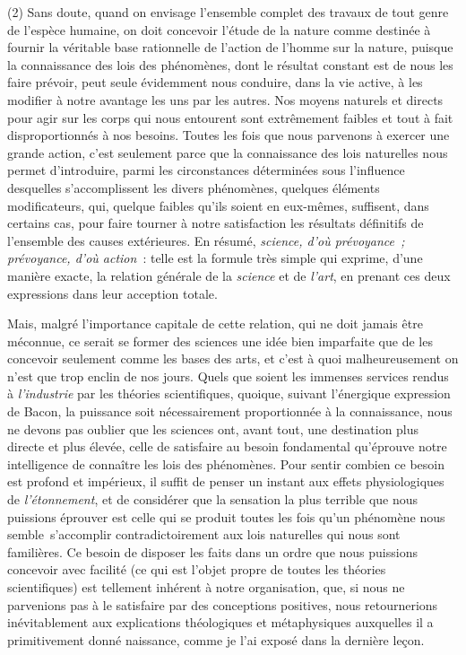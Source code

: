 \documentclass[french,twoside]{book} %
\begin{document}
(2) Sans doute, quand on envisage l’ensemble complet des travaux de tout genre de l’espèce humaine, on doit concevoir l’étude de la nature comme destinée à fournir la véritable base rationnelle de l’action de l’homme sur la nature, puisque la connaissance des lois des phénomènes, dont le résultat constant est de nous les faire prévoir, peut seule évidemment nous conduire, dans la vie active, à les modifier à notre avantage les uns par les autres. Nos moyens naturels et directs pour agir sur les corps qui nous entourent sont extrêmement faibles et tout à fait disproportionnés à nos besoins. Toutes les fois que nous parvenons à exercer une grande action, c’est seulement parce que la connaissance des lois naturelles nous permet d’introduire, parmi les circonstances déterminées sous l’influence desquelles s’accomplissent les divers phénomènes, quelques éléments modificateurs, qui, quelque faibles qu’ils soient en eux-mêmes, suffisent, dans certains cas, pour faire tourner à notre satisfaction les résultats définitifs de l’ensemble des causes extérieures. En résumé, {\itshape science, d’où prévoyance ; prévoyance, d’où action} : telle est la formule très simple qui exprime, d’une manière exacte, la relation générale de la {\itshape science} et de {\itshape l’art}, en prenant ces deux expressions dans leur acception totale.\par
Mais, malgré l’importance capitale de cette relation, qui ne doit jamais être méconnue, ce serait se former des sciences une idée bien imparfaite que de les concevoir seulement comme les bases des arts, et c’est à quoi malheureusement on n’est que trop enclin de nos jours. Quels que soient les immenses services rendus à {\itshape l’industrie} par les théories scientifiques, quoique, suivant l’énergique expression de Bacon, la puissance soit nécessairement proportionnée à la connaissance, nous ne devons pas oublier que les sciences ont, avant tout, une destination plus directe et plus élevée, celle de satisfaire au besoin fondamental qu’éprouve notre intelligence de connaître les lois des phénomènes. Pour sentir combien ce besoin est profond et impérieux, il suffit de penser un instant aux effets physiologiques de {\itshape l’étonnement}, et de considérer que la sensation la plus terrible que nous puissions éprouver est celle qui se produit toutes les fois qu’un phénomène nous semble s’accomplir contradictoirement aux lois naturelles qui nous sont familières. Ce besoin de disposer les faits dans un ordre que nous puissions concevoir avec facilité (ce qui est l’objet propre de toutes les théories scientifiques) est tellement inhérent à notre organisation, que, si nous ne parvenions pas à le satisfaire par des conceptions positives, nous retournerions inévitablement aux explications théologiques et métaphysiques auxquelles il a primitivement donné naissance, comme je l’ai exposé dans la dernière leçon.\par
\end{document}

